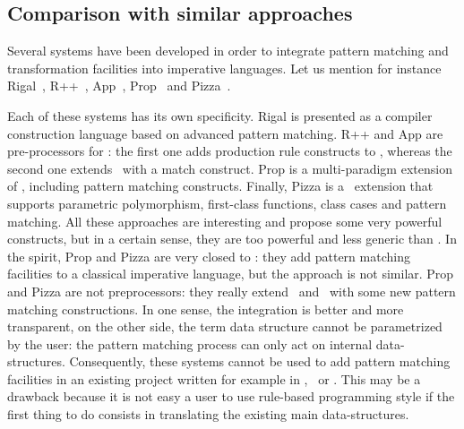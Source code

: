 

\subsection{Comparison with similar approaches}
Several systems have been developed in order to integrate pattern
matching and transformation facilities into imperative languages. 
Let us mention for instance \textsf{Rigal}~\cite{AugustonMi1990a,Rigal},
\textsf{R++}~\cite{CrawfordDLMP-AAAI96,Rpp}, 
\textsf{App}~\cite{App}, \textsf{Prop}~\cite{Prop} and
\textsf{Pizza}~\cite{}. 

Each of these systems has its own specificity. 
\textsf{Rigal} is presented as
a compiler construction language based on advanced pattern matching.
\textsf{R++} and \textsf{App} are pre-processors for \Cplusplus: the first
one adds production rule constructs to \Cplusplus, whereas the second one
extends \Cplusplus\ with a match construct. \textsf{Prop} is a multi-paradigm
extension of \Cplusplus, including pattern matching constructs.
Finally, \textsf{Pizza} is a \Java\ extension that supports 
parametric polymorphism, first-class functions, class cases and
pattern matching. 
All these approaches are interesting and propose some very powerful
constructs, but in a certain sense, they are too powerful and less
generic than \TOM. 
In the spirit, \textsf{Prop} and \textsf{Pizza} are very closed to
\TOM: they add pattern matching facilities to a classical imperative
language, but the approach is not similar.
\textsf{Prop} and \textsf{Pizza} are not preprocessors: they really
extend \Cplusplus\ and \Java\ with some new pattern matching
constructions. In one sense, the integration is better and more
transparent, on the other side, the term data structure cannot be
parametrized by the user: the pattern matching process can only act on 
internal data-structures.  
Consequently, these systems cannot be used to add pattern matching
facilities in an existing project written for example in \C,
\Cplusplus\ or \Java. This may be a drawback because it is not easy a
user to use rule-based programming style if the first thing to do
consists in translating the existing main data-structures.
